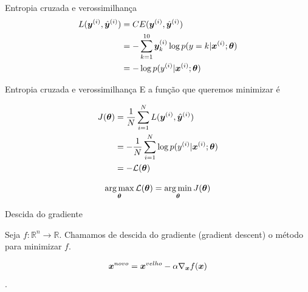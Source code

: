 \documentclass[10pt]{beamer}
\begin{document}
\begin{frame}[fragile]{Entropia cruzada e verossimilhança}
\Large{
\begin{align*}
L(\bm{y}^{(i)}, {\hat{\bm{y}}}^{(i)}) &= CE(\bm{y}^{(i)}, {\hat{\bm{y}}}^{(i)})\\
&= -\sum_{k=1}^{10} \bm{y}^{(i)}_{k}\log p(y=k| \bm{x}^{(i)}; \bm{\theta})\\
&= - \log p(y^{(i)}| \bm{x}^{(i)}; \bm{\theta})\\
\end{align*}
}
\end{frame}

\begin{frame}{Entropia cruzada e verossimilhança}
E a função que queremos minimizar é
\Large{
\begin{align*}
J(\bm{\theta}) &= \frac{1}{N}\sum_{i=1}^{N} L(\bm{y}^{(i)}, {\hat{\bm{y}}}^{(i)})\\
&= - \frac{1}{N}\sum_{i=1}^{N}\log p(y^{(i)}| \bm{x}^{(i)}; \bm{\theta})\\
&= - \mathcal{L}(\bm{\theta})
\end{align*}

\vspace{0.2cm}
\begin{equation*}
\operatorname*{arg\,max}_{\bm{\theta}} \mathcal{L}(\bm{\theta}) =  \operatorname*{arg\,min}_{\bm{\theta}} J(\bm{\theta})
\end{equation*}
}
\end{frame}



\begin{frame}{Descida do gradiente}
\Large{
Seja $f:\mathbb{R}^{n} \rightarrow\mathbb{R}$. Chamamos de descida do gradiente (\alert{gradient descent}) o método para minimizar $f$. 

\vspace{0.3cm}

\begin{equation*}
\bm{x}^{novo} = \bm{x}^{velho} - \alpha \nabla_{\bm{x}} {f(\bm{x})}
\end{equation*}
\vspace{0.3cm}
.
}
\end{frame}
\end{document}
